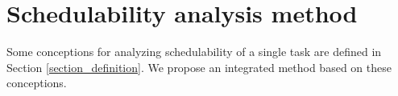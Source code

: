\documentclass[10pt,conference]{IEEEtran}
\begin{document}

\section{Schedulability analysis method}
Some conceptions for analyzing schedulability of a single task are defined in Section \ref{section_definition}. We propose an integrated method based on these conceptions.
\end{document}
